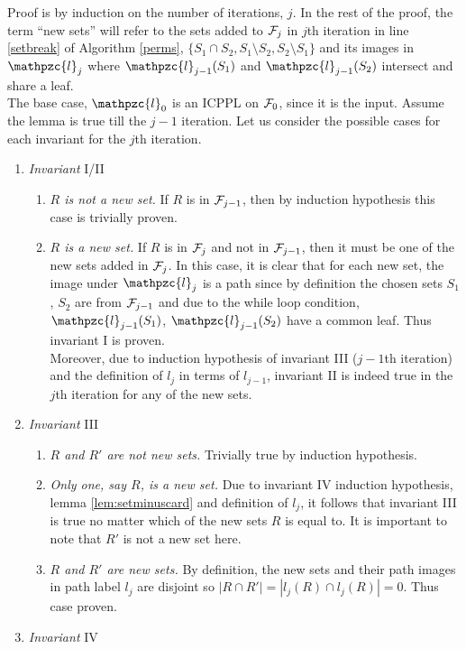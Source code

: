 \documentclass{CRPITStyle} %
\def\cF{{\cal F}}
\def\cl{\mathpzc{l}}
\def\xnoindent{} %
\newenvironment{proof}[1][Proof]{\begin{trivlist} %
\item[\hskip \labelsep {\bfseries #1}]}{\end{trivlist}} %
\begin{document}
\begin{proof}
  Proof is by induction on the number of iterations, $j$. In the rest
  of the proof, the term ``new sets'' will refer to the sets added to
  $\cF_j$ in $j$th iteration in line \ref{setbreak} of Algorithm
  \ref{perms}, $\{S_1 \cap S_2, S_1 \setminus S_2, S_2 \setminus S_1
  \}$ and its images in $\cl_j$ where $\cl_{j-1}(S_1)$
  and $\cl_{j-1}(S_2)$ intersect and share a leaf.\\
  \xnoindent The base case, $\cl_0$ is an ICPPL on $\cF_0$, since it
  is the input.  Assume the lemma is true till the $j-1$
  iteration. Let us consider the possible cases for each invariant for
  the $j$th iteration.

  \xnoindent
 \begin{enumerate}[\textreferencemark]
  \item {\em Invariant} I/II
    \begin{enumerate}[{I/II}a $|$] %
    \item {\em $R$ is not a new set.} If $R$ is in $\cF_{j-1}$, then
      by induction hypothesis this case is trivially proven.
    \item {\em $R$ is a new set.} If $R$ is in $\cF_{j}$ and not in
      $\cF_{j-1}$, then it must be one of the new sets added in
      $\cF_j$. In this case, it is clear that for each new set, the
      image under $\cl_j$ is a path since by definition the chosen
      sets $S_1$, $S_2$ are from $\cF_{j-1}$ and due to the while loop
      condition, $\cl_{j-1}(S_1)$, $\cl_{j-1}(S_2)$ have a
      common leaf. Thus invariant I is proven.\\
      Moreover, due to induction hypothesis of invariant III ($j-1$th
      iteration) and the definition of $l_j$ in terms of $l_{j-1}$,
      invariant II is indeed true in the $j$th iteration for any of
      the new sets.
    \end{enumerate}
  \item {\em Invariant} III
    \begin{enumerate}[{III}a $|$]
    \item {\em $R$ and $R'$ are not new sets.} Trivially true by
      induction hypothesis.
    \item {\em Only one, say $R$, is a new set.} Due to invariant IV
      induction hypothesis, lemma \ref{lem:setminuscard} and
      definition of $l_j$, it follows that invariant III is true no
      matter which of the new sets $R$ is equal to. It is important to
      note that $R'$ is not a new set here.
    \item {\em $R$ and $R'$ are new sets.} By definition, the new
      sets and their path images in path label $l_j$ are disjoint so
      $|R \cap R'| = |l_j(R) \cap l_j(R)| = 0$. Thus case proven.
    \end{enumerate}
  \item {\em Invariant} IV
    

\end{enumerate}
\end{proof}
\end{document}

